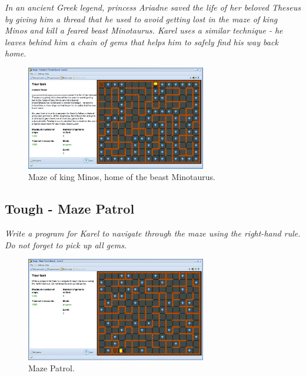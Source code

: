 \documentclass[article,A4,12pt]{llncs}
\begin{document}
{\em In an ancient Greek legend, princess Ariadne saved the life of her 
beloved Theseus by giving him a thread that he used to avoid getting lost 
in the maze of king Minos and kill a feared beast Minotaurus. Karel uses 
a similar technique - he leaves behind him a chain of gems that helps him 
to safely find his way back home. }

\begin{figure}[!ht]
\begin{center}
\includegraphics[width=0.7\textwidth]{img/game-ariadne.png}
\end{center}
\vspace{-4mm}
\caption{Maze of king Minos, home of the beast Minotaurus.}
\label{fig:ariadne}
\vspace{-10mm}
\end{figure}
\noindent

\newpage

\subsection{Tough - Maze Patrol}

{\em Write a program for Karel to navigate through the maze using the 
right-hand rule. Do not forget to pick up all gems.}

\begin{figure}[!ht]
\begin{center}
\includegraphics[width=0.7\textwidth]{img/game-patrol.png}
\end{center}
\vspace{-4mm}
\caption{Maze Patrol.}
\label{fig:patrol}
\vspace{-10mm}
\end{figure}
\noindent
\end{document}
